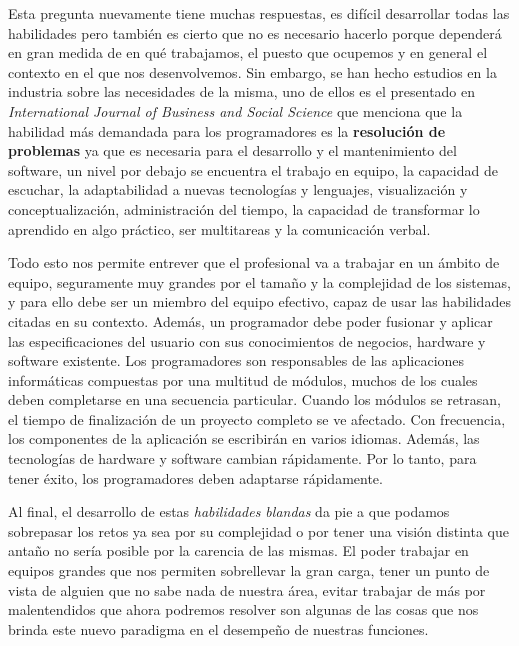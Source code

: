 \noindent Esta pregunta nuevamente tiene muchas respuestas, es difícil desarrollar todas las habilidades pero también es cierto que no es necesario hacerlo porque dependerá en gran medida de en qué trabajamos, el puesto que ocupemos y en general el contexto en el que nos desenvolvemos. Sin embargo, se han hecho estudios en la industria sobre las necesidades de la misma, uno de ellos es el presentado en \textit{International Journal of Business and Social Science} que menciona que la habilidad más demandada para los programadores es la \textbf{resolución de problemas} ya que es necesaria para el desarrollo y el mantenimiento del software, un nivel por debajo se encuentra el trabajo en equipo, la capacidad de escuchar, la adaptabilidad a nuevas tecnologías y lenguajes, visualización y conceptualización, administración del tiempo, la capacidad de transformar lo aprendido en algo práctico, ser multitareas y la comunicación verbal. 
\vspace{5mm}

\noindent Todo esto nos permite entrever que el profesional va a trabajar en un ámbito de equipo, seguramente muy grandes por el tamaño y la complejidad de los sistemas, y para ello debe ser un miembro del equipo efectivo, capaz de usar las habilidades citadas en su contexto. Además, un programador debe poder fusionar y aplicar las especificaciones del usuario con sus conocimientos de negocios, hardware y software existente. Los programadores son responsables de las aplicaciones informáticas compuestas por una multitud de módulos, muchos de los cuales deben completarse en una secuencia particular. Cuando los módulos se retrasan, el tiempo de finalización de un proyecto completo se ve afectado. Con frecuencia, los componentes de la aplicación se escribirán en varios idiomas. Además, las tecnologías de hardware y software cambian rápidamente. Por lo tanto, para tener éxito, los programadores deben adaptarse rápidamente. \cite{ijbss:2014}
\vspace{5mm}

\noindent Al final, el desarrollo de estas \textit{habilidades blandas} da pie a que podamos sobrepasar los retos ya sea por su complejidad o por tener una visión distinta que antaño no sería posible por la carencia de las mismas. El poder trabajar en equipos grandes que nos permiten sobrellevar la gran carga, tener un punto de vista de alguien que no sabe nada de nuestra área, evitar trabajar de más por malentendidos que ahora podremos resolver son algunas de las cosas que nos brinda este nuevo paradigma en el desempeño de nuestras funciones.